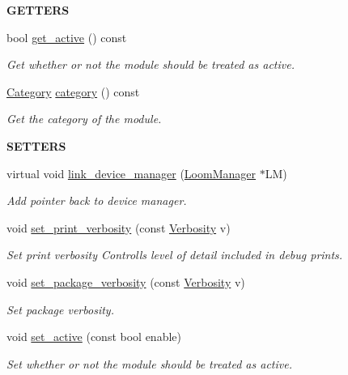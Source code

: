 \begin{Indent}{\bf G\+E\+T\+T\+E\+RS}
\begin{DoxyCompactItemize}
bool \hyperlink{class_loom_module_a1bb79ab68994c51851998a31b982da72}{get\+\_\+active} () const 
\begin{DoxyCompactList}\small\item\em Get whether or not the module should be treated as active. \end{DoxyCompactList}\item 
\hyperlink{class_loom_module_a0c6ecc60315f95af551138dc83567068}{Category} \hyperlink{class_loom_module_abe41c7748d6f6566b6e96918dca12106}{category} () const 
\begin{DoxyCompactList}\small\item\em Get the category of the module. \end{DoxyCompactList}\end{DoxyCompactItemize}
\end{Indent}
\begin{Indent}{\bf S\+E\+T\+T\+E\+RS}\par
\begin{DoxyCompactItemize}
\item 
virtual void \hyperlink{class_loom_module_adc08f87bf7c0c0988decee196a714396}{link\+\_\+device\+\_\+manager} (\hyperlink{class_loom_manager}{Loom\+Manager} $\ast$LM)
\begin{DoxyCompactList}\small\item\em Add pointer back to device manager. \end{DoxyCompactList}\item 
void \hyperlink{class_loom_module_a5008d47cff50ffa2e6fe4f813c3ffa1e}{set\+\_\+print\+\_\+verbosity} (const \hyperlink{_misc_8h_abf3be10d03894afb391f3a2935e3b313}{Verbosity} v)
\begin{DoxyCompactList}\small\item\em Set print verbosity Controlls level of detail included in debug prints. \end{DoxyCompactList}\item 
void \hyperlink{class_loom_module_a096b13557553a7fb283a32ab3645815b}{set\+\_\+package\+\_\+verbosity} (const \hyperlink{_misc_8h_abf3be10d03894afb391f3a2935e3b313}{Verbosity} v)
\begin{DoxyCompactList}\small\item\em Set package verbosity. \end{DoxyCompactList}\item 
void \hyperlink{class_loom_module_aaac9a713ba6389818cefdc740718ad9e}{set\+\_\+active} (const bool enable)
\begin{DoxyCompactList}\small\item\em Set whether or not the module should be treated as active. \end{DoxyCompactList}\end{DoxyCompactItemize}
\end{Indent}
